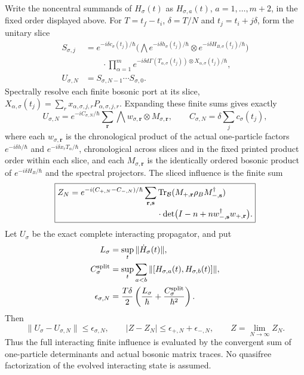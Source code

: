 \documentclass[12pt,a4paper]{article}
\begin{document}
\begin{theorem}
Write the noncentral summands of $H_\sigma(t)$ as $H_{\sigma,a}(t)$,
$a=1,\ldots,m+2$, in the fixed order displayed above. For $T=t_f-t_i$,
$\delta=T/N$ and $t_j=t_i+j\delta$, form the unitary slice
\[
\begin{aligned}
 S_{\sigma,j}&=e^{-i\delta c_\sigma(t_j)/\hbar}
 \bigl(\bigwedge e^{-i\delta h_\sigma(t_j)/\hbar}
                        \otimes e^{-i\delta H_{B,\sigma}(t_j)/\hbar}\bigr)\\
 &\qquad{}\cdot\prod_{\alpha=1}^m
 e^{-i\delta d\Gamma(T_{\alpha,\sigma}(t_j))
                         \otimes X_{\alpha,\sigma}(t_j)/\hbar},\\
 U_{\sigma,N}&=S_{\sigma,N-1}\cdots S_{\sigma,0}.
\end{aligned}
\]
Spectrally resolve each finite bosonic port at its slice,
$X_{\alpha,\sigma}(t_j)=\sum_r x_{\alpha,\sigma,j,r}
P_{\alpha,\sigma,j,r}$. Expanding these finite sums gives exactly
\[
 U_{\sigma,N}=e^{-iC_{\sigma,N}/\hbar}
 \sum_{\mathbf r}\bigwedge w_{\sigma,\mathbf r}
                                  \otimes M_{\sigma,\mathbf r},
 \qquad C_{\sigma,N}=\delta\sum_jc_\sigma(t_j),
\]
where each $w_{\sigma,\mathbf r}$ is the chronological product of the
actual one-particle factors $e^{-i\delta h/\hbar}$ and
$e^{-i\delta x_rT_\alpha/\hbar}$, chronological across slices
and in the fixed printed product order within each slice, and each
$M_{\sigma,\mathbf r}$ is
the identically ordered bosonic product of $e^{-i\delta H_B/\hbar}$
and the spectral projectors. The sliced influence is the finite sum
\begin{equation}
\boxed{\begin{aligned}
 Z_N={}&e^{-i(C_{+,N}-C_{-,N})/\hbar}
 \sum_{\mathbf r,\mathbf s}
 \operatorname{Tr}_{\mathcal B}
       (M_{+,\mathbf r}\rho_B M_{-,\mathbf s}^\dagger)\\[-2pt]
 &\hspace{32mm}\cdot
 \det\bigl(I-n+n w_{-,\mathbf s}^\dagger w_{+,\mathbf r}\bigr).
\end{aligned}}
\label{p4:eq:v248-interacting-determinant-sum}
\end{equation}
Let $U_\sigma$ be the exact complete interacting propagator, and put
\[
\begin{aligned}
 L_\sigma&=\sup_t\|\dot H_\sigma(t)\|,\\
 C_\sigma^{\rm split}&=\sup_t\sum_{a<b}
                         \|[H_{\sigma,a}(t),H_{\sigma,b}(t)]\|,\\
 \epsilon_{\sigma,N}&=\frac{T\delta}{2}
       \left(\frac{L_\sigma}{\hbar}
                       +\frac{C_\sigma^{\rm split}}{\hbar^2}\right).
\end{aligned}
\]
Then
\[
 \boxed{\|U_\sigma-U_{\sigma,N}\|\le\epsilon_{\sigma,N},\qquad
 |Z-Z_N|\le\epsilon_{+,N}+\epsilon_{-,N},\qquad
 Z=\lim_{N\to\infty}Z_N.}
\]
Thus the full interacting finite influence is evaluated by the convergent
sum of one-particle determinants and actual bosonic matrix traces.
No quasifree factorization of the evolved interacting state is assumed.
\end{theorem}
\end{document}
